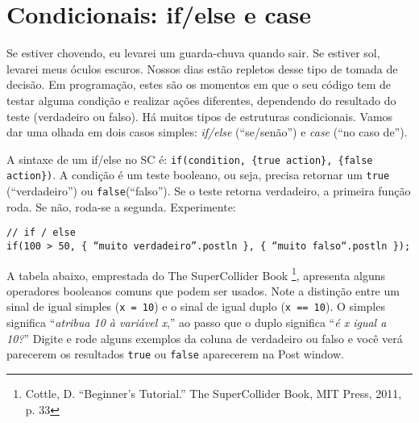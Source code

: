 \section{Condicionais: if/else e case}

Se estiver chovendo, eu levarei um guarda-chuva quando sair. Se estiver sol, levarei meus óculos escuros. Nossos dias estão repletos desse tipo de tomada de decisão. Em programação, estes são os momentos em que o seu código tem de testar alguma condição e realizar ações diferentes, dependendo do resultado do teste (verdadeiro ou falso). Há muitos tipos de estruturas condicionais. Vamos dar uma olhada em dois casos simples: \emph{if/else} (“se/senão”) e \emph{case} (“no caso de”).

A sintaxe de um if/else no SC é: \texttt{if(condition, \{true action\}, \{false action\})}. A condição é um teste booleano, ou seja, precisa retornar um \texttt{true} (“verdadeiro”) ou \texttt{false}(“falso”). Se o teste retorna verdadeiro, a primeira função roda. Se não, roda-se a segunda. Experimente:

\begin{lstlisting}[style=SuperCollider-IDE, basicstyle=\scttfamily\footnotesize]
// if / else 
if(100 > 50, { “muito verdadeiro”.postln }, { “muito falso“.postln });
\end{lstlisting}

A tabela abaixo, emprestada do The SuperCollider Book \footnote{Cottle, D. “Beginner's Tutorial.” The SuperCollider Book, MIT Press, 2011, p. 33}, apresenta alguns operadores booleanos comuns que podem ser usados.
Note a distinção entre um sinal de igual simples (\texttt{x = 10}) e o sinal de igual duplo (\texttt{x == 10}). O simples significa “\textit{atribua 10 à variável x},” ao passo que o duplo significa “\textit{é x igual a 10?}” Digite e rode alguns exemplos da coluna de verdadeiro ou falso e você verá parecerem os resultados \texttt{true} ou  \texttt{false} aparecerem na Post window.
 
